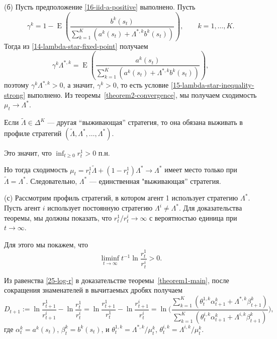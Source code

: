 \documentclass[a4paper,12pt,russian]{article} %
\theoremstyle{definition}
\DeclareMathOperator{\E}{E}
\renewcommand{\tilde}{\widetilde}
\begin{document}
(б) Пусть предположение \eqref{16-iid-a-positive} выполнено.
Пусть
\begin{equation}
\label{gt-iid}
\gamma^k 
= 1 - \E\left( \frac{b^k(s_t)}{\sum_{k=1}^K (a^k(s_t) + \Lambda^{*,k} b^k(s_t))}\right),
  \qquad k=1,\dots,K.
\end{equation}
Тогда из \eqref{14-lambda-star-fixed-point} получаем
\begin{equation}
\label{gt-lambda-iid}
\gamma^k \Lambda^{*,k} 
= \E \left(
  \frac{a^k(s_t)}
       {\sum_{k=1}^K(a^k(s_t) + \Lambda^{*,k} b^k(s_t))}
  \right),
\end{equation}
поэтому $\gamma^k\Lambda^{*,k}>0$, а значит, $\gamma^k>0$, то есть условие \eqref{15-lambda-star-inequality-strong} выполнено.
Из теоремы~\ref{theorem2-convergence}, мы получаем сходимость $\mu_t\to\Lambda^*$.

Если $\tilde\Lambda\in \Delta^K$ — другая ``выживающая'' стратегия, то она обязана выживать в профиле стратегий $(\tilde\Lambda, \Lambda^*,\dots,\Lambda^*)$.

Это значит, что $\inf_{t\ge 0} r_t^1 > 0$ п.н.

Но тогда сходимость $\mu_t = r_t^1\tilde\Lambda + (1-r_t^1)\Lambda^* \to \Lambda^*$ имеет место только при $\tilde\Lambda = \Lambda^*$.
Следовательно, $\Lambda^*$ — единственная "выживающая'' стратегия.

(с) Рассмотрим профиль стратегий, в котором агент 1 использует стратегию $\Lambda^*$.
Пусть агент $i$ использует постоянную стратегию $\Lambda^i\neq\Lambda^*$.
Для доказательства теоремы, мы должны показать, что $r_t^1/r_t^i \to \infty$ с вероятностью единица при $t\to\infty$.

Для этого мы покажем, что 
\begin{equation}
\label{36-liminf}
\liminf_{t\to\infty} t^{-1} \ln \frac{r_t^1}{r_t^i} > 0.
\end{equation}

Из равенства \eqref{25-log-r} в доказательстве теоремы~\ref{theorem1-main}, после сокращения знаменателей в вычитаемых дробях получаем
\[
D_{t+1} := \ln\frac{r_{t+1}^1}{r_{t+1}^i} - \ln\frac{r_t^1}{r_t^i}= 
\ln\frac{r_{t+1}^1}{r_{t}^1} - \ln\frac{r_{t+1}^i}{r_t^i}
= \ln\Biggl(
  \frac{\sum_{k=1}^K(\theta_{t}^{1,k} \alpha_{t+1}^k + \Lambda^{*,k}\beta_{t+1}^k)}
       {\sum_{k=1}^K(\theta_{t}^{i,k} \alpha_{t+1}^k + \Lambda^{i,k}\beta_{t+1}^k)}
  \Biggr),
\]
где $\alpha_{t}^k = a^k(s_t)$, $\beta_{t}^k = b^k(s_t)$, и $\theta_{t}^{1,k} = \Lambda^{*,k}/\mu_{t}^k$, $\theta_{t}^{i,k} = \Lambda^{i,k}/\mu_{t}^k$. 
\end{document}
